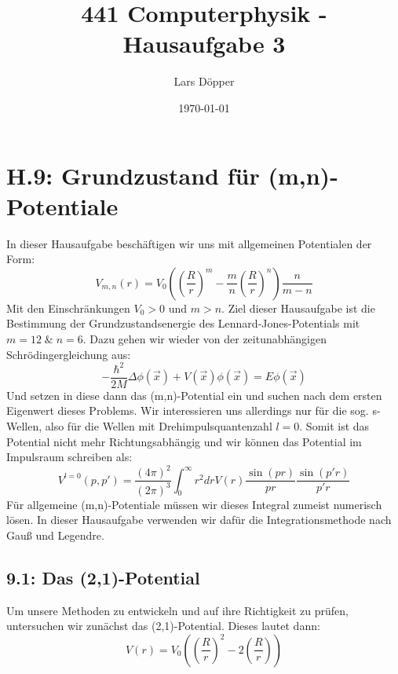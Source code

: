 \documentclass[11pt,a4paper]{article}
\author{Lars Döpper}
\date{\today}
\title{441 Computerphysik - Hausaufgabe 3}
\begin{document}
	\maketitle
\section*{H.9: Grundzustand für (m,n)-Potentiale}
In dieser Hausaufgabe beschäftigen wir uns mit allgemeinen Potentialen der Form:
\begin{equation}
V_{m,n}(r) = V_0\left( \left(\frac{R}{r}\right)^{m} -\frac{m}{n}\left(\frac{R}{r}\right)^{n} \right)\frac{n}{m-n}
\end{equation}
Mit den Einschränkungen $V_0>0$ und $m>n$. Ziel dieser Hausaufgabe ist  die Bestimmung der Grundzustandsenergie des Lennard-Jones-Potentials mit $m=12 \; \&\; n=6$. Dazu gehen wir wieder von der zeitunabhängigen Schrödingergleichung aus:
\begin{equation}\label{eq:schrödinger}
	-\frac{\hbar^2}{2M}\Delta\phi(\vec{x}) + V(\vec{x})\phi(\vec{x}) = E\phi(\vec{x})
\end{equation}
Und setzen in diese dann das (m,n)-Potential ein und suchen nach dem ersten Eigenwert dieses Problems.
Wir interessieren uns allerdings nur für die sog. s-Wellen, also für die Wellen mit Drehimpulsquantenzahl $l=0$. Somit ist das Potential nicht mehr Richtungsabhängig und wir können das Potential im  Impulsraum schreiben als:
\begin{equation}
	V^{l=0}(p, p')=\frac{(4\pi)^2}{(2\pi)^3}\int_{0}^{\infty}r^2drV(r)\frac{\sin(pr)}{pr}\frac{\sin(p'r)}{p'r}
\end{equation}
Für allgemeine (m,n)-Potentiale müssen wir dieses Integral zumeist numerisch lösen. In dieser Hausaufgabe verwenden wir dafür die Integrationsmethode nach Gauß und Legendre.
\subsection*{9.1: Das  (2,1)-Potential}
Um unsere Methoden zu entwickeln und auf ihre Richtigkeit zu prüfen, untersuchen wir zunächst das  (2,1)-Potential.  Dieses lautet dann:
\begin{equation}\label{eq:21pot}
	V(r) = V_0\left(\left(\frac{R}{r}\right)^2 -2\left(\frac{R}{r}\right)\right)
\end{equation}
\end{document}
